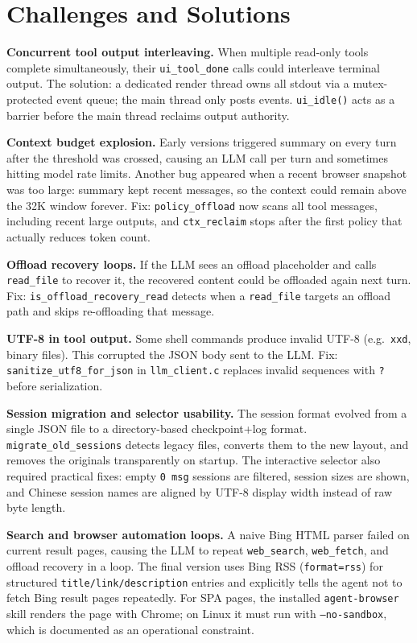 \documentclass[11pt,a4paper]{article}
\begin{document}
\section{Challenges and Solutions}

\textbf{Concurrent tool output interleaving.}
When multiple read-only tools complete simultaneously, their
\texttt{ui\_tool\_done} calls could interleave terminal output. The solution:
a dedicated render thread owns all stdout via a mutex-protected event queue;
the main thread only posts events. \texttt{ui\_idle()} acts as a barrier
before the main thread reclaims output authority.

\textbf{Context budget explosion.}
Early versions triggered summary on every turn after the threshold was
crossed, causing an LLM call per turn and sometimes hitting model rate limits.
Another bug appeared when a recent browser snapshot was too large: summary kept
recent messages, so the context could remain above the 32K window forever. Fix:
\texttt{policy\_offload} now scans all tool messages, including recent large
outputs, and \texttt{ctx\_reclaim} stops after the first policy that actually
reduces token count.

\textbf{Offload recovery loops.}
If the LLM sees an offload placeholder and calls \texttt{read\_file} to
recover it, the recovered content could be offloaded again next turn. Fix:
\texttt{is\_offload\_recovery\_read} detects when a \texttt{read\_file} targets
an offload path and skips re-offloading that message.

\textbf{UTF-8 in tool output.}
Some shell commands produce invalid UTF-8 (e.g.\ \texttt{xxd}, binary files).
This corrupted the JSON body sent to the LLM. Fix:
\texttt{sanitize\_utf8\_for\_json} in \texttt{llm\_client.c} replaces
invalid sequences with \texttt{?} before serialization.

\textbf{Session migration and selector usability.}
The session format evolved from a single JSON file to a directory-based
checkpoint+log format. \texttt{migrate\_old\_sessions} detects legacy files,
converts them to the new layout, and removes the originals transparently on
startup. The interactive selector also required practical fixes: empty
\texttt{0 msg} sessions are filtered, session sizes are shown, and Chinese
session names are aligned by UTF-8 display width instead of raw byte length.

\textbf{Search and browser automation loops.}
A naive Bing HTML parser failed on current result pages, causing the LLM to
repeat \texttt{web\_search}, \texttt{web\_fetch}, and offload recovery in a
loop. The final version uses Bing RSS (\texttt{format=rss}) for structured
\texttt{title/link/description} entries and explicitly tells the agent not to
fetch Bing result pages repeatedly. For SPA pages, the installed
\texttt{agent-browser} skill renders the page with Chrome; on Linux it must run
with \texttt{--no-sandbox}, which is documented as an operational constraint.
\end{document}
